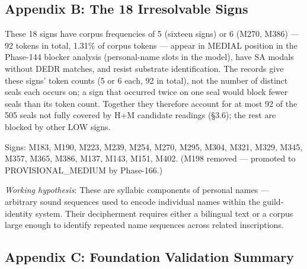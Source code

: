 \documentclass[
]{article}
\begin{document}
\subsection{Appendix B: The 18 Irresolvable
Signs}\label{appendix-b-the-18-irresolvable-signs}

These 18 signs have corpus frequencies of 5 (sixteen signs) or 6 (M270, M386) --- 92 tokens in total, 1.31\% of corpus tokens --- appear in MEDIAL position in the Phase-144 blocker analysis (personal-name slots in the model), have SA modals without DEDR matches, and resist substrate identification. The records give these signs' token counts (5 or 6 each, 92 in total), not the number of distinct seals each occurs on; a sign that occurred twice on one seal would block fewer seals than its token count. Together they therefore account for at most 92 of the 505 seals not fully covered by H+M candidate readings (\S3.6); the rest are blocked by other LOW signs.

Signs: M183, M190, M223, M239, M254, M270, M295, M304, M321, M329,
M345, M357, M365, M386, M137, M143, M151, M402. (M198 removed --- promoted to PROVISIONAL\_MEDIUM by Phase-166.)

\emph{Working hypothesis}: These are syllabic components of personal
names --- arbitrary sound sequences used to encode individual names
within the guild-identity system. Their decipherment requires either a
bilingual text or a corpus large enough to identify repeated name
sequences across related inscriptions.

\subsection{Appendix C: Foundation Validation
Summary}\label{appendix-c-foundation-validation-summary}
\end{document}
